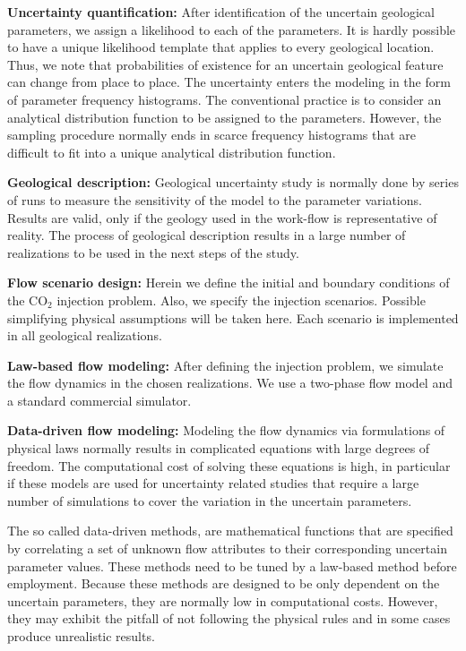 \textbf{Uncertainty quantification:} After identification of the uncertain
geological parameters, we assign a likelihood to each of the parameters. It is
hardly possible to have a unique likelihood template that applies to every
geological location. Thus, we note that probabilities of existence for an
uncertain geological feature can change from place to place. The uncertainty
enters the modeling in the form of parameter frequency histograms. The
conventional practice is to consider an analytical distribution function to be
assigned to the parameters. However, the sampling procedure normally ends in
scarce frequency histograms that are difficult to fit into a unique analytical
distribution function.

\textbf{Geological description:} Geological uncertainty study is normally done
by series of runs to measure the sensitivity of the model to the parameter
variations. Results are valid, only if the geology used in the work-flow is
representative of reality. The process of geological description results in a
large number of realizations to be used in the next steps of the study.

\textbf{Flow scenario design:} Herein we define the initial and boundary
conditions of the $\mbox{CO}_2$ injection problem. Also, we specify the
injection scenarios. Possible simplifying physical assumptions will be taken
here. Each scenario is implemented in all geological realizations.

\textbf{Law-based flow modeling:} After defining the injection problem, we
simulate the flow dynamics in the chosen realizations. We use a two-phase flow
model and a standard commercial simulator.


\textbf{Data-driven flow modeling:} Modeling the flow dynamics via formulations
of physical laws normally results in complicated equations with large degrees of
freedom. The computational cost of solving these equations is high, in
particular if these models are used for uncertainty related studies that require
a large number of simulations to cover the variation in the uncertain
parameters. 

The so called data-driven methods, are mathematical functions that are specified
by correlating a set of unknown flow attributes to their corresponding uncertain
parameter values. These methods need to be tuned by a law-based method before
employment. Because these methods are designed to be only dependent on the
uncertain parameters, they are normally low in computational costs. However,
they may exhibit the pitfall of not following the physical rules and in some
cases produce unrealistic results. 


